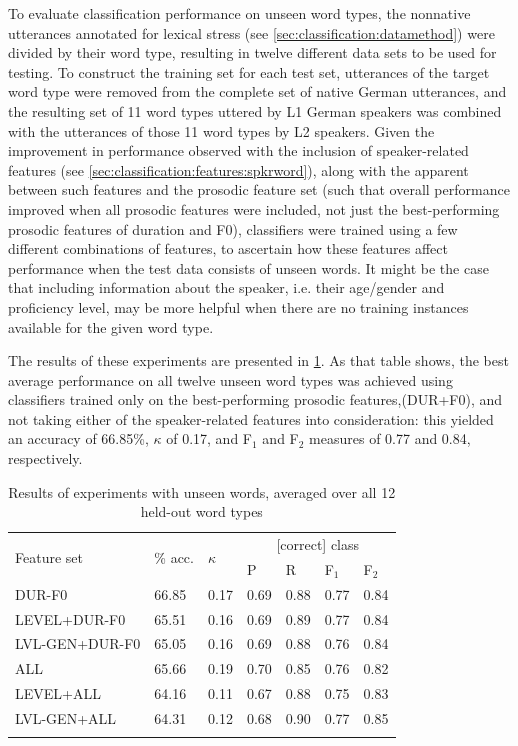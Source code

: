 	
	To evaluate classification performance on unseen word types, the nonnative utterances annotated for lexical stress (see \cref{sec:classification:datamethod}) were divided by their word type, resulting in twelve different data sets to be used for testing. To construct the training set for each test set, utterances of the target word type  were removed from the complete set of native German utterances, and the resulting set of 11 word types uttered by L1 German speakers was combined with the utterances of those 11 word types by L2 speakers. Given the improvement in performance observed with the inclusion of speaker-related features (see \cref{sec:classification:features:spkrword}), along with the apparent  between such features and the prosodic feature set (such that overall performance improved when all prosodic features were included, not just the best-performing prosodic features of duration and F0), classifiers were trained using a few  different combinations of features, to ascertain how these features affect performance when the test data consists of unseen words. It might be the case that including information about the speaker, i.e. their age/gender and proficiency level, may be more helpful when there are no training instances available for the given word type. 
	
	The results of these experiments are presented in \cref{tab:results:words}. As that table shows, the best average performance on all twelve unseen word types was achieved using classifiers trained only on the best-performing prosodic features,(DUR+F0), and not taking either of the speaker-related features into consideration: this yielded an accuracy of 66.85\%, $\kappa$ of 0.17, and F$_1$ and F$_2$ measures of 0.77 and 0.84, respectively. 
	
	
	\begin{table}
			\centering
			\caption[Results of experiments with unseen words]{Results of experiments with unseen words, averaged over all 12 held-out word types   }
			\begin{tabularx}{\textwidth}{lXXXXXX}		
			\toprule
			\multirow{2}{*}{Feature set} & \multirow{2}{*}{\% acc.} & \multirow{2}{*}{$\kappa$} & \multicolumn{4}{c}{[correct] class} \\
			\cmidrule(lr){4-7}
			& & & P & R & F$_1$ & F$_2$ \\
			\midrule
DUR-F0	&	66.85	&	0.17	&	0.69	&	0.88	&	0.77	&	0.84	\\
{LEVEL+DUR-F0}	&	65.51	&	0.16	&	0.69	&	0.89	&	0.77	&	0.84	\\
{LVL-GEN+DUR-F0}	&	65.05	&	0.16	&	0.69	&	0.88	&	0.76	&	0.84	\\
			\midrule								
ALL	&	65.66	&	0.19	&	0.70	&	0.85	&	0.76	&	0.82	\\
{LEVEL+ALL}	&	64.16	&	0.11	&	0.67	&	0.88	&	0.75	&	0.83	\\
{LVL-GEN+ALL}	&	64.31	&	0.12	&	0.68	&	0.90	&	0.77	&	0.85	\\

		\bottomrule
			\label{tab:results:words}
			\end{tabularx}
		\end{table}	
	
